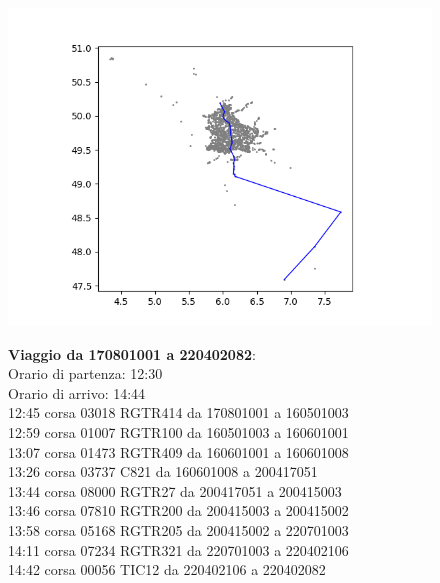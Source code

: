 \documentclass{article}
\begin{document}
\begin{figure}[H]
	\begin{minipage}{0.55\linewidth}
		\centering
		\hspace*{-3cm}\includegraphics[width=1.0\linewidth, valign=t]{figures/Figure_1}
	\end{minipage}
	\hspace*{-2cm}\begin{minipage}{0.7\linewidth}
		\textbf{Viaggio da 170801001 a 220402082}:\\
		Orario di partenza: 12:30\\
		Orario di arrivo: 14:44\\
		12:45 corsa 03018 RGTR414 da 170801001 a 160501003\\
		12:59 corsa 01007 RGTR100 da 160501003 a 160601001\\
		13:07 corsa 01473 RGTR409 da 160601001 a 160601008\\
		13:26 corsa 03737 C821 da 160601008 a 200417051\\
		13:44 corsa 08000 RGTR27 da 200417051 a 200415003\\
		13:46 corsa 07810 RGTR200 da 200415003 a 200415002\\
		13:58 corsa 05168 RGTR205 da 200415002 a 220701003\\
		14:11 corsa 07234 RGTR321 da 220701003 a 220402106\\
		14:42 corsa 00056 TIC12 da 220402106 a 220402082
		
			\end{minipage}
\end{figure}
\end{document}
